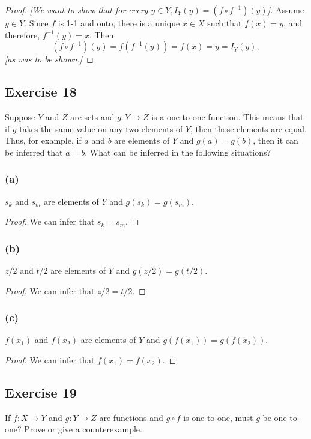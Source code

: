 \documentclass[14pt]{extarticle}
\begin{document}
\begin{proof}
{\it [We want to show that for every \(y \in Y, I_Y(y) = (f \circ f^{-1})(y)\)].} Assume \(y \in Y\). Since $f$ is 1-1 
and onto, there is a unique \(x \in X\) such that \(f(x) = y\), and therefore, \(f^{-1}(y) = x\). Then
\[
(f \circ f^{-1})(y) = f(f^{-1}(y)) = f(x) = y = I_Y(y),
\]
{\it [as was to be shown.]}
\end{proof}

\subsection{Exercise 18}
Suppose $Y$ and $Z$ are sets and \(g: Y \to Z\) is a one-to-one function. This means that if $g$ takes the same 
value on any two elements of $Y$, then those elements are equal. Thus, for example, if $a$ and $b$ are elements of 
$Y$ and \(g(a) = g(b)\), then it can be inferred that $a = b$. What can be inferred in the following situations?

\subsubsection{(a)}
$s_k$ and $s_m$ are elements of $Y$ and \(g(s_k) = g(s_m)\).

\begin{proof}
We can infer that \(s_k = s_m\).
\end{proof}

\subsubsection{(b)}
$z/2$ and $t/2$ are elements of $Y$ and \(g(z/2) = g(t/2)\).

\begin{proof}
We can infer that \(z/2 = t/2\).
\end{proof}

\subsubsection{(c)}
$f(x_1)$ and $f(x_2)$ are elements of $Y$ and \(g(f(x_1)) = g(f(x_2))\).

\begin{proof}
We can infer that \(f(x_1) = f(x_2)\).
\end{proof}

\subsection{Exercise 19}
If \(f: X \to Y\) and \(g: Y \to Z\) are functions and \(g \circ f\) is one-to-one, must $g$ be one-to-one? 
Prove or give a counterexample.
\end{document}
